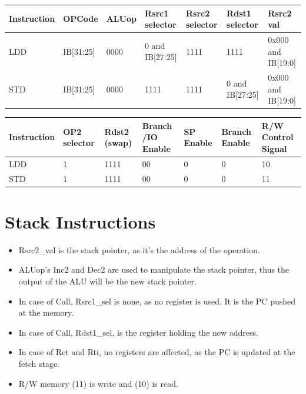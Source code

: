 \documentclass[12pt]{report}
\begin{document}
\begin{center}
\begin{tabular}{||p{20mm}| p{15mm}| p{15mm}| p{15mm}| p{15mm}| p{15mm}| p{15mm}||} 
\hline
Instruction & OPCode & ALUop & Rsrc1 selector & Rsrc2 selector & Rdst1 selector & Rsrc2 val \\ [0.5ex] 
\hline\hline
LDD & IB[31:25] & 0000 & 0 and IB[27:25] & 1111 & 1111 & 0x000 and IB[19:0] \\
\hline
STD & IB[31:25] & 0000 & 1111 & 1111 & 0 and IB[27:25] & 0x000 and IB[19:0] \\
\hline
\end{tabular}
\end{center}

\begin{center}
\begin{tabular}{||p{20mm}| p{15mm}| p{15mm}| p{15mm}| p{15mm}| p{15mm}| p{15mm}||} 
\hline
Instruction & OP2 selector & Rdst2 (swap) & Branch /IO Enable & SP Enable & Branch Enable & R/W Control Signal  \\ [0.5ex] 
\hline\hline
LDD & 1 & 1111 & 00 & 0 & 0 & 10 \\
\hline
STD & 1 & 1111 & 00 & 0 & 0 & 11 \\
\hline
\end{tabular}
\end{center}

\section{Stack Instructions}
\begin{itemize}
    \item Rsrc2\_val is the stack pointer, as it's the address of the operation.
    \item ALUop's Inc2 and Dec2 are used to manipulate the stack pointer, thus the output of the ALU will be the new stack pointer.
    \item In case of Call, Rsrc1\_sel is none, as no register is used. It is the PC pushed at the memory.
    \item In case of Call, Rdst1\_sel, is the register holding the new address.
    \item In case of Ret and Rti, no registers are affected, as the PC is updated at the fetch stage.
    \item R/W memory (11) is write and (10) is read.
\end{itemize}
\end{document}
